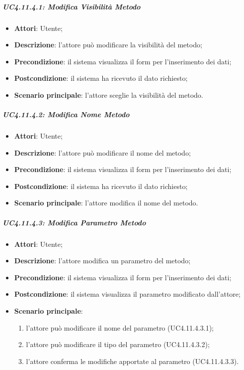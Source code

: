 \subparagraph{UC4.11.4.1: Modifica Visibilità Metodo}
\label{UC4.11.4.1}
\begin{itemize}
	\item \textbf{Attori}: Utente;
	\item \textbf{Descrizione}: l'attore può modificare la visibilità del metodo;
	\item \textbf{Precondizione}: il sistema visualizza il form per l'inserimento dei dati;
	\item \textbf{Postcondizione}: il sistema ha ricevuto il dato richiesto;
	\item \textbf{Scenario principale}: l'attore sceglie la visibilità del metodo.
\end{itemize}

\subparagraph{UC4.11.4.2: Modifica Nome Metodo}
\label{UC4.11.4.2}
\begin{itemize}
	\item \textbf{Attori}: Utente;
	\item \textbf{Descrizione}: l'attore può modificare il nome del metodo;
	\item \textbf{Precondizione}: il sistema visualizza il form per l'inserimento dei dati;
	\item \textbf{Postcondizione}: il sistema ha ricevuto il dato richiesto;
	\item \textbf{Scenario principale}: l'attore modifica il nome del metodo.
\end{itemize}

\subparagraph{UC4.11.4.3: Modifica Parametro Metodo}
\label{UC4.11.4.3}
\begin{itemize}
	\item \textbf{Attori}: Utente;
	\item \textbf{Descrizione}: l'attore modifica un parametro del metodo;
	\item \textbf{Precondizione}: il sistema visualizza il form per l'inserimento dei dati;
	\item \textbf{Postcondizione}: il sistema visualizza il parametro modificato dall'attore;
	\item \textbf{Scenario principale}:
	\begin{enumerate}
		\item l'attore può modificare il nome del parametro (UC4.11.4.3.1);
		\item l'attore può modificare il tipo del parametro (UC4.11.4.3.2);
		\item l'attore conferma le modifiche apportate al parametro (UC4.11.4.3.3).
	\end{enumerate}
\end{itemize}

